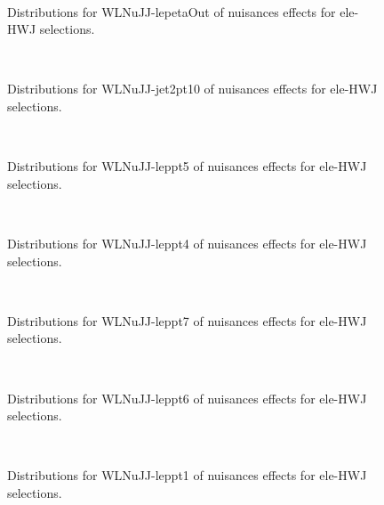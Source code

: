 \begin{figure}[htbp]  
\centering 
\\ 
\caption{ 
   Distributions for WLNuJJ-lepetaOut of nuisances effects for ele-HWJ selections.
} 
\label{fig:WLNuJJ_lepetaOut_ele_HWJ} 
\end{figure} 




\begin{figure}[htbp]  
\centering 
\\ 
\caption{ 
   Distributions for WLNuJJ-jet2pt10 of nuisances effects for ele-HWJ selections.
} 
\label{fig:WLNuJJ_jet2pt10_ele_HWJ} 
\end{figure} 




\begin{figure}[htbp]  
\centering 
\\ 
\caption{ 
   Distributions for WLNuJJ-leppt5 of nuisances effects for ele-HWJ selections.
} 
\label{fig:WLNuJJ_leppt5_ele_HWJ} 
\end{figure} 




\begin{figure}[htbp]  
\centering 
\\ 
\caption{ 
   Distributions for WLNuJJ-leppt4 of nuisances effects for ele-HWJ selections.
} 
\label{fig:WLNuJJ_leppt4_ele_HWJ} 
\end{figure} 




\begin{figure}[htbp]  
\centering 
\\ 
\caption{ 
   Distributions for WLNuJJ-leppt7 of nuisances effects for ele-HWJ selections.
} 
\label{fig:WLNuJJ_leppt7_ele_HWJ} 
\end{figure} 




\begin{figure}[htbp]  
\centering 
\\ 
\caption{ 
   Distributions for WLNuJJ-leppt6 of nuisances effects for ele-HWJ selections.
} 
\label{fig:WLNuJJ_leppt6_ele_HWJ} 
\end{figure} 




\begin{figure}[htbp]  
\centering 
\\ 
\caption{ 
   Distributions for WLNuJJ-leppt1 of nuisances effects for ele-HWJ selections.
} 
\label{fig:WLNuJJ_leppt1_ele_HWJ} 
\end{figure} 




